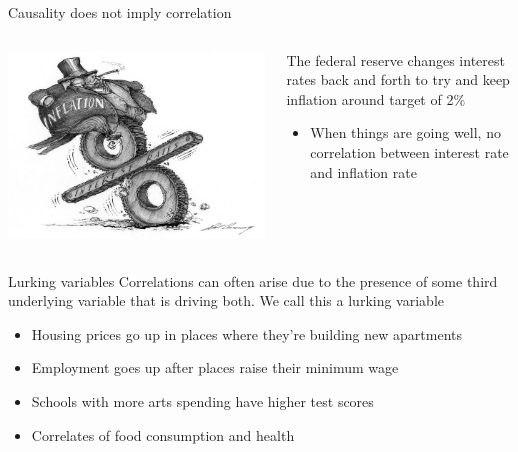 \documentclass[aspectratio=169,t,11pt,table]{beamer}
\begin{document}
\begin{frame}{Causality does not imply correlation}
  \begin{columns}[T]
    \begin{column}{.6\textwidth}
			\vspace*{-\bigskipamount}
      \begin{center}
        \includegraphics[width = \textwidth]{figures/fed_balance_grey.jpg}
      \end{center}
    \end{column}
    \begin{column}{.4\textwidth}
      The federal reserve changes interest rates back and forth to try and keep inflation around target of 2\% 
      \begin{itemize}
        \item When things are going well, no correlation between interest rate and inflation rate
      \end{itemize}
    \end{column}
  \end{columns}
\end{frame}

\begin{frame}{Lurking variables}
  Correlations can often arise due to the presence of some third underlying variable that is driving both. We call this a \alert{lurking variable}
  \begin{itemize}
    \item Housing prices go up in places where they're building new apartments
    
    \item Employment goes up after places raise their minimum wage
    
    \item Schools with more arts spending have higher test scores
    
    \item Correlates of food consumption and health
    
  \end{itemize}
\end{frame}
\end{document}
